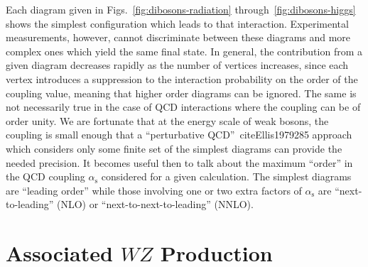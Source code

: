Each diagram given in Figs.~\ref{fig:dibosons-radiation} through~\ref{fig:dibosons-higgs} shows the simplest configuration which leads to that interaction.  Experimental measurements, however, cannot discriminate between these diagrams and more complex ones which yield the same final state.  In general, the contribution from a given diagram decreases rapidly as the number of vertices increases, since each vertex introduces a suppression to the interaction probability on the order of the coupling value, meaning that higher order diagrams can be ignored.  The same is not necessarily true in the case of QCD interactions where the coupling can be of order unity.  We are fortunate that at the energy scale of weak bosons, the coupling is small enough that a ``perturbative QCD''~cite{Ellis1979285} approach which considers only some finite set of the simplest diagrams can provide the needed precision.  It becomes useful then to talk about the maximum ``order'' in the QCD coupling $\alpha_\text{s}$ considered for a given calculation.  The simplest diagrams are ``leading order'' while those involving one or two extra factors of $\alpha_\text{s}$ are ``next-to-leading'' (NLO) or ``next-to-next-to-leading'' (NNLO).

\section{Associated $WZ$ Production}


